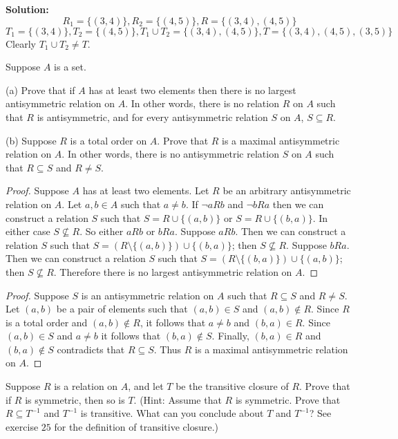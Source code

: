 \textbf{Solution:}
\[R_1 = \{(3, 4)\}, R_2 = \{(4, 5)\}, R = \{(3, 4), (4, 5)\}\]
\[T_1 = \{(3, 4)\}, T_2 = \{(4, 5)\}, T_1 \cup T_2 = \{(3, 4), (4, 5)\}, T = \{(3, 4), (4, 5), (3, 5)\}\]
Clearly $T_1 \cup T_2 \ne T$.

\begin{tcolorbox}[title=Problem 28, breakable]
    Suppose $A$ is a set.

    (a) Prove that if $A$ has at least two elements then there is no largest antisymmetric
        relation on $A$. In other words, there is no relation $R$ on $A$ such that 
        $R$ is antisymmetric, and for every antisymmetric relation $S$ on $A$, $S \subseteq R$.

    (b) Suppose $R$ is a total order on $A$. Prove that $R$ is a maximal antisymmetric relation 
        on $A$. In other words, there is no antisymmetric relation $S$ on $A$ such that $R \subseteq S$
        and $R \not= S$.
\end{tcolorbox}

\begin{proof}
    Suppose $A$ has at least two elements. 
    Let $R$ be an arbitrary antisymmetric relation on $A$.
    Let $a, b \in A$ such that $a \not = b$. If $\neg aRb$ and $\neg bRa$ then we 
    can construct a relation $S$ such that $S = R \cup \{(a, b)\}$ or $S = R \cup \{(b, a)\}$.
    In either case $S \not\subseteq R$. So either $aRb$ or $bRa$.
    Suppose $aRb$. Then we can construct a relation $S$ such that 
    $S = (R \setminus \{(a, b)\}) \cup \{(b, a)\}$;
        then $S \not\subseteq R$.
    Suppose $bRa$. Then we can construct a relation $S$ such that 
    $S = (R \setminus \{(b, a)\}) \cup \{(a, b)\}$;
        then $S \not\subseteq R$.
    Therefore there is no largest antisymmetric relation on $A$.
\end{proof}

\begin{proof}
    Suppose $S$ is an antisymmetric relation on $A$ such that 
        $R \subseteq S$ and $R \not = S$.
    Let $(a, b)$ be a pair of elements such that $(a, b) \in S$
        and $(a, b) \not \in R$.
    Since $R$ is a total order and $(a,b) \notin R$, it follows that $a \not = b$
        and $(b, a) \in R$.
    Since $(a, b) \in S$ and $a \not = b$ it follows that $(b, a) \not \in S$.
    Finally, $(b, a) \in R$ and $(b, a) \not \in S$ contradicts that $R \subseteq S$.
    Thus $R$ is a maximal antisymmetric relation on $A$.
\end{proof}

\begin{tcolorbox}[title=Problem 30, breakable]
    Suppose $R$ is a relation on $A$, and let $T$ be the transitive closure of $R$.
    Prove that if $R$ is symmetric, then so is $T$. (Hint: Assume that $R$ is symmetric.
    Prove that $R \subseteq T^{-1}$ and $T^{-1}$ is transitive. What can you conclude 
    about $T$ and $T^{-1}$? See exercise $25$ for the definition of transitive closure.)
\end{tcolorbox}

